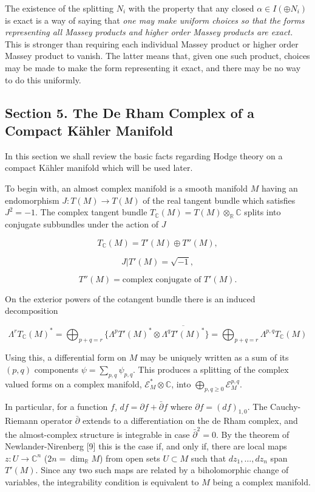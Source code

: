\documentclass[
  english,
  a3paper,
  a3paper]{extarticle}
\begin{document}
The existence of the splitting \(N_i\) with the property that any closed
\(\alpha\in I(\oplus N_i)\) is exact is a way of saying that \emph{one
may make uniform choices so that the forms representing all Massey
products and higher order Massey products are exact.} This is stronger
than requiring each individual Massey product or higher order Massey
product to vanish. The latter means that, given one such product,
choices may be made to make the form representing it exact, and there
may be no way to do this uniformly.

\subsection{Section 5. The De Rham Complex of a Compact Kähler
Manifold}\label{section-5.-the-de-rham-complex-of-a-compact-kuxe4hler-manifold}

In this section we shall review the basic facts regarding Hodge theory
on a compact Kähler manifold which will be used later.

To begin with, an almost complex manifold is a smooth manifold \(M\)
having an endomorphism \(J:T(M)\to T(M)\) of the real tangent bundle
which satisfies \(J^2=-1\). The complex tangent bundle
\(T_{\mathbb C}(M)=T(M)\otimes_{\mathbb R}\mathbb C\) splits into
conjugate subbundles under the action of \(J\)

\[T_{\mathbb C}(M)=T'(M)\oplus T''(M),\]

\[J|T'(M)=\sqrt{-1},\]

\[T''(M)=\text{complex conjugate of }T'(M).\]

On the exterior powers of the cotangent bundle there is an induced
decomposition

\[\Lambda^rT_{\mathbb C}(M)^*=\bigoplus_{p+q=r}\{\Lambda^pT'(M)^*\otimes\overline{\Lambda^qT'(M)^*}\}=\bigoplus_{p+q=r}\Lambda^{p,q}T_{\mathbb C}(M)\]

Using this, a differential form on \(M\) may be uniquely written as a
sum of its \((p,q)\) components \(\psi=\sum_{p,q}\psi_{p,q}\). This
produces a splitting of the complex valued forms on a complex manifold,
\(\mathcal E_M^*\otimes\mathbb C\), into
\(\bigoplus_{p,q\ge0}\mathcal E_M^{p,q}\).

In particular, for a function \(f\), \(df=\partial f+\bar\partial f\)
where \(\partial f=(df)_{1,0}\). The Cauchy-Riemann operator
\(\bar\partial\) extends to a differentiation on the de Rham complex,
and the almost-complex structure is integrable in case
\(\bar\partial^2=0\). By the theorem of Newlander-Nirenberg {[}9{]} this
is the case if, and only if, there are local maps \(z:U\to\mathbb C^n\)
(\(2n=\dim_{\mathbb R}M\)) from open sets \(U\subset M\) such that
\(dz_1,\ldots,dz_n\) span \(T'(M)\). Since any two such maps are related
by a biholomorphic change of variables, the integrability condition is
equivalent to \(M\) being a complex manifold.
\end{document}
